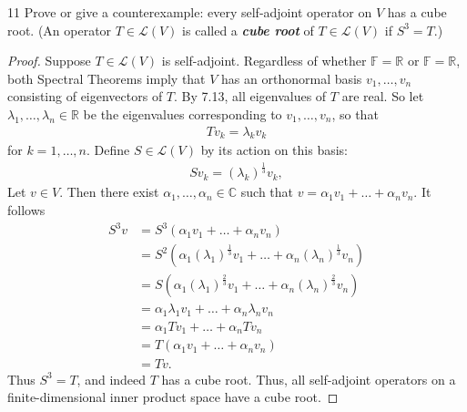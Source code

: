 \documentclass{extarticle}
\newenvironment{problem}[1]{\begin{prob*}{#1}{}}{\end{prob*}}
\newcommand{\R}{\mathbb{R}}
\newcommand{\C}{\mathbb{C}}
\newcommand{\F}{\mathbb{F}}
\newcommand{\Hom}{\mathcal{L}}
\begin{document}
\begin{problem}{11}
Prove or give a counterexample: every self-adjoint operator on $V$ has a cube root.  (An operator $T\in\Hom(V)$ is called a \textbf{\textit{cube root}} of $T\in\Hom(V)$ if $S^3 = T$.)
\end{problem}
\begin{proof}
Suppose $T\in\Hom(V)$ is self-adjoint.  Regardless of whether $\F=\R$ or $\F =\R$, both Spectral Theorems imply that $V$ has an orthonormal basis $v_1,\dots, v_n$ consisting of eigenvectors of $T$.  By 7.13, all eigenvalues of $T$ are real.  So let $\lambda_1,\dots, \lambda_n\in\R$ be the eigenvalues corresponding to $v_1,\dots, v_n$, so that
\begin{align*}
Tv_k = \lambda_k v_k
\end{align*}
for $k = 1,\dots, n$.  Define $S\in\Hom(V)$ by its action on this basis:
\begin{align*}
Sv_k = (\lambda_k)^\frac{1}{3}v_k,
\end{align*}
Let $v\in V$.  Then there exist $\alpha_1,\dots, \alpha_n\in\C$ such that $v = \alpha_1v_1 + \dots + \alpha_nv_n$.  It follows
\begin{align*}
S^3 v &= S^3( \alpha_1v_1 + \dots + \alpha_nv_n)\\
&= S^2\left(\alpha_1(\lambda_1)^\frac{1}{3}v_1 + \dots + \alpha_n(\lambda_n)^\frac{1}{3}v_n\right)\\
&= S\left(\alpha_1(\lambda_1)^\frac{2}{3}v_1 + \dots + \alpha_n(\lambda_n)^\frac{2}{3} v_n\right)\\
&= \alpha_1\lambda_1v_1 + \dots + \alpha_n\lambda_n v_n\\
&= \alpha_1Tv_1 + \dots + \alpha_nTv_n\\
&= T( \alpha_1v_1 + \dots + \alpha_nv_n)\\
&= Tv.
\end{align*}
Thus $S^3 = T$, and indeed $T$ has a cube root.  Thus, all self-adjoint operators on a finite-dimensional inner product space have a cube root.
\end{proof}
\end{document}
